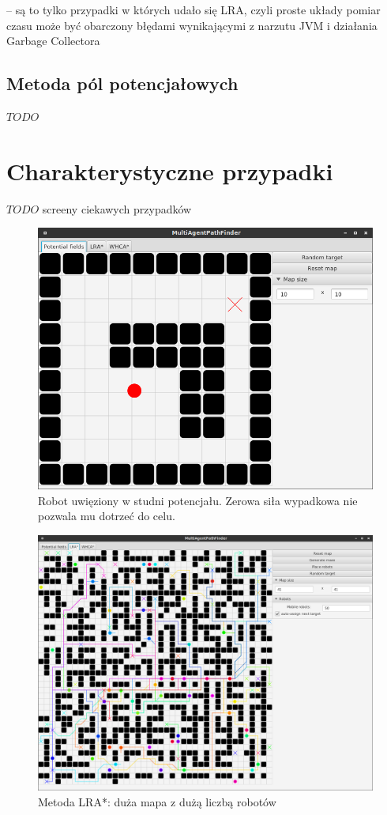 -- są to tylko przypadki w których udało się LRA, czyli proste układy
pomiar czasu może być obarczony błędami wynikającymi z narzutu JVM i działania Garbage Collectora


\subsection{Metoda pól potencjałowych}
$TODO$

\section{Charakterystyczne przypadki}
$TODO$ screeny ciekawych przypadków

\begin{figure}
	\centering
	\includegraphics[width=0.8\columnwidth]{img/robopath/field-potential-hole}
	\caption{Robot uwięziony w studni potencjału. Zerowa siła wypadkowa nie pozwala mu dotrzeć do celu.}
	\label{fig:test-field-potential-hole}
\end{figure}

\begin{figure}
	\centering
	\includegraphics[width=0.8\columnwidth]{img/robopath/lra-bigmap}
	\caption{Metoda LRA*: duża mapa z dużą liczbą robotów}
	\label{fig:test-lra-bigmap}
\end{figure}


